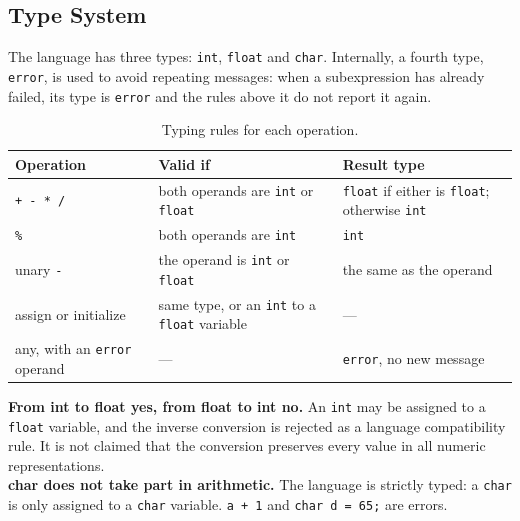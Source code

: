 \documentclass[12pt,letterpaper]{article}
\newcommand{\cod}[1]{\texttt{#1}} %
\newcommand{\anchotabla}{0.9\textwidth} %
\begin{document}
\subsection{Type System}

The language has three types: \cod{int}, \cod{float} and \cod{char}. Internally, a fourth type, \cod{error}, is used to avoid repeating messages: when a subexpression has already failed, its type is \cod{error} and the rules above it do not report it again.

\begin{table}[H]
\centering
\small
\renewcommand{\arraystretch}{1.2}
\begin{tabular}{@{}>{\raggedright\arraybackslash}p{0.28\dimexpr\anchotabla}
                  >{\raggedright\arraybackslash}p{0.34\dimexpr\anchotabla}
                  >{\raggedright\arraybackslash}p{0.34\dimexpr\anchotabla}@{}}
\toprule
\textbf{Operation} & \textbf{Valid if} & \textbf{Result type} \\
\midrule
\cod{+ - * /} & both operands are \cod{int} or \cod{float} & \cod{float} if either is \cod{float}; otherwise \cod{int} \\
\addlinespace
\cod{\%} & both operands are \cod{int} & \cod{int} \\
\addlinespace
unary \cod{-} & the operand is \cod{int} or \cod{float} & the same as the operand \\
\addlinespace
assign or initialize & same type, or an \cod{int} to a \cod{float} variable & --- \\
\addlinespace
any, with an \cod{error} operand & --- & \cod{error}, no new message \\
\bottomrule
\end{tabular}
\caption{Typing rules for each operation.}\label{tab:typing}
\end{table}

\textbf{From int to float yes, from float to int no.} An \cod{int} may be assigned to a \cod{float} variable, and the inverse conversion is rejected as a language compatibility rule. It is not claimed that the conversion preserves every value in all numeric representations.\\

\textbf{char does not take part in arithmetic.} The language is strictly typed: a \cod{char} is only assigned to a \cod{char} variable. \cod{\textquotesingle a\textquotesingle{} + 1} and \cod{char d = 65;} are errors.\\
\end{document}
